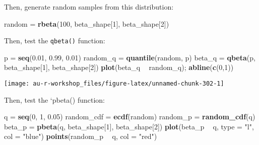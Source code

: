 \documentclass[]{book}
\newenvironment{Shaded}{\begin{snugshade}}{\end{snugshade}}
\newcommand{\KeywordTok}[1]{\textcolor[rgb]{0.13,0.29,0.53}{\textbf{#1}}}
\newcommand{\DataTypeTok}[1]{\textcolor[rgb]{0.13,0.29,0.53}{#1}}
\newcommand{\DecValTok}[1]{\textcolor[rgb]{0.00,0.00,0.81}{#1}}
\newcommand{\FloatTok}[1]{\textcolor[rgb]{0.00,0.00,0.81}{#1}}
\newcommand{\StringTok}[1]{\textcolor[rgb]{0.31,0.60,0.02}{#1}}
\newcommand{\OperatorTok}[1]{\textcolor[rgb]{0.81,0.36,0.00}{\textbf{#1}}}
\newcommand{\NormalTok}[1]{#1}
\theoremstyle{definition}
\theoremstyle{definition}
\theoremstyle{definition}
\theoremstyle{remark}
\begin{document}
Then, generate random samples from this distribution:

\begin{Shaded}
\begin{Highlighting}[]
\NormalTok{random =}\StringTok{ }\KeywordTok{rbeta}\NormalTok{(}\DecValTok{100}\NormalTok{, beta_shape[}\DecValTok{1}\NormalTok{], beta_shape[}\DecValTok{2}\NormalTok{])}
\end{Highlighting}
\end{Shaded}

Then, test the \texttt{qbeta()} function:

\begin{Shaded}
\begin{Highlighting}[]
\NormalTok{p =}\StringTok{ }\KeywordTok{seq}\NormalTok{(}\FloatTok{0.01}\NormalTok{, }\FloatTok{0.99}\NormalTok{, }\FloatTok{0.01}\NormalTok{)}
\NormalTok{random_q =}\StringTok{ }\KeywordTok{quantile}\NormalTok{(random, p)}
\NormalTok{beta_q =}\StringTok{ }\KeywordTok{qbeta}\NormalTok{(p, beta_shape[}\DecValTok{1}\NormalTok{], beta_shape[}\DecValTok{2}\NormalTok{])}
\KeywordTok{plot}\NormalTok{(beta_q }\OperatorTok{~}\StringTok{ }\NormalTok{random_q); }\KeywordTok{abline}\NormalTok{(}\KeywordTok{c}\NormalTok{(}\DecValTok{0}\NormalTok{,}\DecValTok{1}\NormalTok{))}
\end{Highlighting}
\end{Shaded}

\begin{center}\texttt{[image: au-r-workshop\_files/figure-latex/unnamed-chunk-302-1]} \end{center}

Then, test the `pbeta() function:

\begin{Shaded}
\begin{Highlighting}[]
\NormalTok{q =}\StringTok{ }\KeywordTok{seq}\NormalTok{(}\DecValTok{0}\NormalTok{, }\DecValTok{1}\NormalTok{, }\FloatTok{0.05}\NormalTok{)}
\NormalTok{random_cdf =}\StringTok{ }\KeywordTok{ecdf}\NormalTok{(random)}
\NormalTok{random_p =}\StringTok{ }\KeywordTok{random_cdf}\NormalTok{(q)}
\NormalTok{beta_p =}\StringTok{ }\KeywordTok{pbeta}\NormalTok{(q, beta_shape[}\DecValTok{1}\NormalTok{], beta_shape[}\DecValTok{2}\NormalTok{])}
\KeywordTok{plot}\NormalTok{(beta_p }\OperatorTok{~}\StringTok{ }\NormalTok{q, }\DataTypeTok{type =} \StringTok{"l"}\NormalTok{, }\DataTypeTok{col =} \StringTok{"blue"}\NormalTok{)}
\KeywordTok{points}\NormalTok{(random_p }\OperatorTok{~}\StringTok{ }\NormalTok{q, }\DataTypeTok{col =} \StringTok{"red"}\NormalTok{)}
\end{Highlighting}
\end{Shaded}
\end{document}
